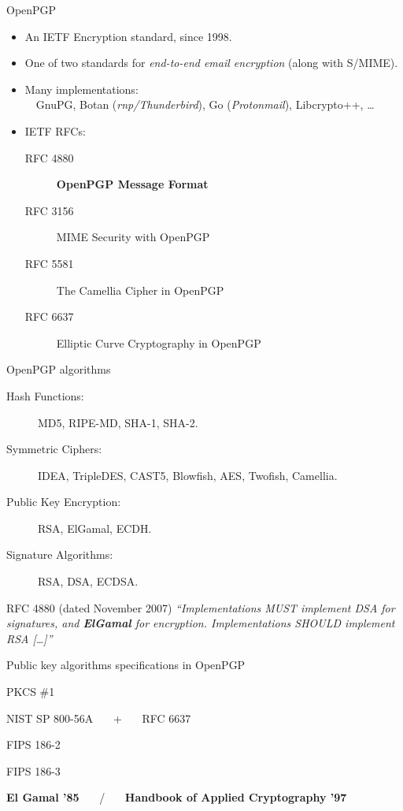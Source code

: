 \documentclass[aspectratio=169]{beamer}
\begin{document}
\begin{frame}{OpenPGP}
  \large
  \begin{itemize}
    \setlength{\itemsep}{1em}
  \item An IETF Encryption standard, since 1998.
  \item One of two standards for \emph{end-to-end email encryption}
    (along with S/MIME).
  \item Many implementations:\\
    ~~GnuPG, Botan (\emph{rnp/Thunderbird}), Go
    (\emph{Protonmail}), Libcrypto++, \dots
  \item IETF RFCs:
    \begin{description}
    \item[RFC 4880 ] \textbf{OpenPGP Message Format}
    \item[RFC 3156 ] MIME Security with OpenPGP
    \item[RFC 5581 ] The Camellia Cipher in OpenPGP
    \item[RFC 6637 ] Elliptic Curve Cryptography in OpenPGP
    \end{description}
  \end{itemize}
\end{frame}


\begin{frame}{OpenPGP algorithms}
  \large
  \begin{description}
  \item[Hash Functions:] MD5, RIPE-MD, SHA-1, SHA-2.
  \item[Symmetric Ciphers:] IDEA, TripleDES, CAST5, Blowfish, AES,
    Twofish, Camellia.
  \item[Public Key Encryption:] RSA, ElGamal, ECDH.
  \item[Signature Algorithms:] RSA, DSA, ECDSA.
  \end{description}

  \bigskip
  
  \begin{block}{RFC 4880 \small(dated November 2007)}
    \it ``Implementations MUST implement DSA for signatures, and
    \textbf{ElGamal} for encryption. Implementations SHOULD implement
    RSA [\dots]''
  \end{block}
\end{frame}


\begin{frame}{Public key algorithms specifications in OpenPGP}
  \large
  \begin{description}
    \setlength{\itemsep}{1em}
  \item[RSA ] PKCS \#1
  \item[ECDH ] NIST SP 800-56A ~~~+~~~ RFC 6637
  \item[DSA ] FIPS 186-2
  \item[ECDSA ] FIPS 186-3
  \item[ElGamal ] \textbf{El Gamal '85} ~~~/~~~ \textbf{Handbook of Applied Cryptography '97}
  \end{description}
\end{frame}
\end{document}

